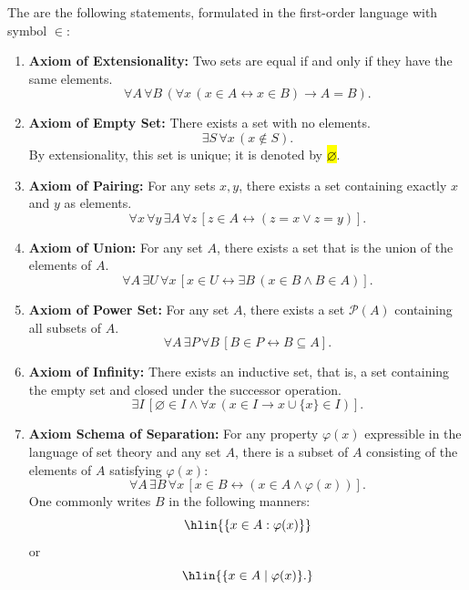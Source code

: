 \begin{definition} \label{definition:zermelo_fraenkel_set_theory}
The  are the following statements, formulated in the first-order language with symbol $\in$:
\begin{enumerate}

  \item \textbf{Axiom of Extensionality:} Two sets are equal if and only if they have the same elements.
  $$\forall A\, \forall B\, (\forall x\, (x \in A \leftrightarrow x \in B) \rightarrow A = B).$$

  \item \textbf{Axiom of Empty Set:} There exists a set with no elements.
  $$\exists S\, \forall x\, (x \notin S).$$
  By extensionality, this set is unique; it is denoted by \hl{$\varnothing$}.

  \item \textbf{Axiom of Pairing:} For any sets $x, y$, there exists a set containing exactly $x$ and $y$ as elements.
  $$\forall x\, \forall y\, \exists A\, \forall z\, [z \in A \leftrightarrow (z = x \vee z = y)].$$

  \item \textbf{Axiom of Union:} For any set $A$, there exists a set that is the union of the elements of $A$.
  $$\forall A\, \exists U\, \forall x\, [x \in U \leftrightarrow \exists B\, (x \in B \wedge B \in A)].$$

  \item \textbf{Axiom of Power Set:} For any set $A$, there exists a set $\mathcal{P}(A)$ containing all subsets of $A$.
  $$\forall A\, \exists P\, \forall B\, [B \in P \leftrightarrow B \subseteq A].$$

  \item \textbf{Axiom of Infinity:} There exists an inductive set, that is, a set containing the empty set and closed under the successor operation.
  $$\exists I\, [\varnothing \in I \wedge \forall x\, (x \in I \rightarrow x \cup \{x\} \in I)].$$

  \item \textbf{Axiom Schema of Separation:} For any property $\varphi(x)$ expressible in the language of set theory and any set $A$, there is a subset of $A$ consisting of the elements of $A$ satisfying $\varphi(x)$:
  $$\forall A\, \exists B\, \forall x\, [x \in B \leftrightarrow (x \in A \wedge \varphi(x))].$$
  One commonly writes $B$ in the following manners:
  $$\hlin{\{x \in A: \varphi(x)\}}$$
  or
  $$\hlin{\{x \in A \mid \varphi(x)\}.}$$


\end{enumerate}
\end{definition}
